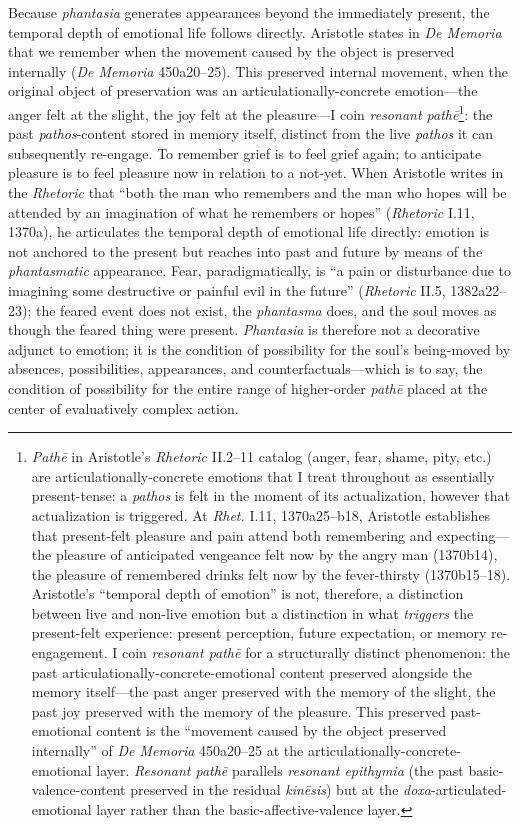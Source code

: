 Because \textit{phantasia} generates appearances beyond the immediately present, the temporal depth of emotional life follows directly. Aristotle states in \textit{De Memoria} that we remember when the movement caused by the object is preserved internally (\textit{De Memoria} 450a20--25). This preserved internal movement, when the original object of preservation was an articulationally-concrete emotion---the anger felt at the slight, the joy felt at the pleasure---I coin \textit{resonant pathē}\footnote{\textit{Pathē} in Aristotle's \textit{Rhetoric} II.2--11 catalog (anger, fear, shame, pity, etc.) are articulationally-concrete emotions that I treat throughout as essentially present-tense: a \textit{pathos} is felt in the moment of its actualization, however that actualization is triggered. At \textit{Rhet.} I.11, 1370a25--b18, Aristotle establishes that present-felt pleasure and pain attend both remembering and expecting---the pleasure of anticipated vengeance felt now by the angry man (1370b14), the pleasure of remembered drinks felt now by the fever-thirsty (1370b15--18). Aristotle's ``temporal depth of emotion'' is not, therefore, a distinction between live and non-live emotion but a distinction in what \textit{triggers} the present-felt experience: present perception, future expectation, or memory re-engagement. I coin \textit{resonant pathē} for a structurally distinct phenomenon: the past articulationally-concrete-emotional content preserved alongside the memory itself---the past anger preserved with the memory of the slight, the past joy preserved with the memory of the pleasure. This preserved past-emotional content is the ``movement caused by the object preserved internally'' of \textit{De Memoria} 450a20--25 at the articulationally-concrete-emotional layer. \textit{Resonant pathē} parallels \textit{resonant epithymia} (the past basic-valence-content preserved in the residual \textit{kinēsis}) but at the \textit{doxa}-articulated-emotional layer rather than the basic-affective-valence layer.}: the past \textit{pathos}-content stored in memory itself, distinct from the live \textit{pathos} it can subsequently re-engage. To remember grief is to feel grief again; to anticipate pleasure is to feel pleasure now in relation to a not-yet. When Aristotle writes in the \textit{Rhetoric} that ``both the man who remembers and the man who hopes will be attended by an imagination of what he remembers or hopes'' (\textit{Rhetoric} I.11, 1370a), he articulates the temporal depth of emotional life directly: emotion is not anchored to the present but reaches into past and future by means of the \textit{phantasmatic} appearance. Fear, paradigmatically, is ``a pain or disturbance due to imagining some destructive or painful evil in the future'' (\textit{Rhetoric} II.5, 1382a22--23); the feared event does not exist, the \textit{phantasma} does, and the soul moves as though the feared thing were present. \textit{Phantasia} is therefore not a decorative adjunct to emotion; it is the condition of possibility for the soul's being-moved by absences, possibilities, appearances, and counterfactuals---which is to say, the condition of possibility for the entire range of higher-order \textit{pathē} placed at the center of evaluatively complex action.

